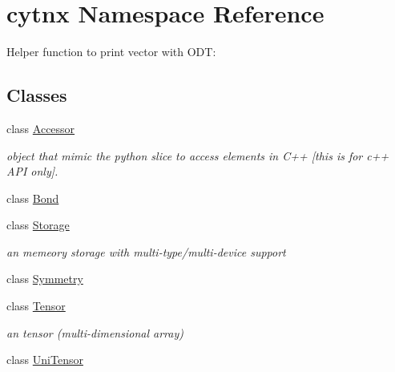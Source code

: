 \hypertarget{namespacecytnx}{}\section{cytnx Namespace Reference}
\label{namespacecytnx}


Helper function to print vector with O\+DT\+:  


\subsection*{Classes}
\begin{DoxyCompactItemize}
\item 
class \hyperlink{classcytnx_1_1Accessor}{Accessor}
\begin{DoxyCompactList}\small\item\em object that mimic the python slice to access elements in C++ \mbox{[}this is for c++ A\+PI only\mbox{]}. \end{DoxyCompactList}\item 
class \hyperlink{classcytnx_1_1Bond}{Bond}
\item 
class \hyperlink{classcytnx_1_1Storage}{Storage}
\begin{DoxyCompactList}\small\item\em an memeory storage with multi-\/type/multi-\/device support \end{DoxyCompactList}\item 
class \hyperlink{classcytnx_1_1Symmetry}{Symmetry}
\item 
class \hyperlink{classcytnx_1_1Tensor}{Tensor}
\begin{DoxyCompactList}\small\item\em an tensor (multi-\/dimensional array) \end{DoxyCompactList}\item 
class \hyperlink{classcytnx_1_1UniTensor}{Uni\+Tensor}
\end{DoxyCompactItemize}
